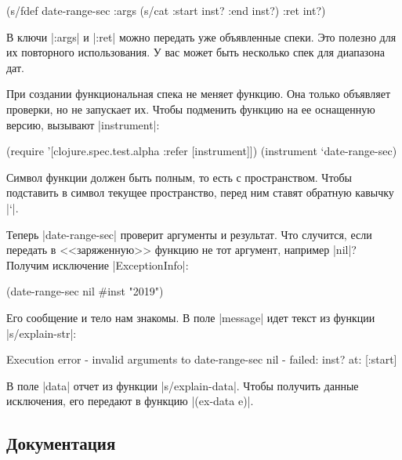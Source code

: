 \begin{english}
  \begin{clojure}
(s/fdef date-range-sec
  :args (s/cat :start inst? :end inst?)
  :ret int?)
  \end{clojure}
\end{english}

В ключи \spverb|:args| и \spverb|:ret| можно передать уже объявленные спеки. Это
полезно для их повторного использования. У вас может быть несколько спек для
диапазона дат.

При создании функциональная спека не меняет функцию. Она только объявляет
проверки, но не запускает их. Чтобы подменить функцию на ее оснащенную версию,
вызывают \spverb|instrument|:

\begin{english}
  \begin{clojure}
(require '[clojure.spec.test.alpha :refer [instrument]])
(instrument `date-range-sec)
  \end{clojure}
\end{english}

Символ функции должен быть полным, то есть с пространством. Чтобы подставить в
символ текущее пространство, перед ним ставят обратную кавычку \spverb|`|.

Теперь \spverb|date-range-sec| проверит аргументы и результат. Что случится,
если передать в <<заряженную>> функцию не тот аргумент, например \spverb|nil|?
Получим исключение \spverb|ExceptionInfo|:

\begin{english}
  \begin{clojure}
(date-range-sec nil #inst "2019")
  \end{clojure}
\end{english}

Его сообщение и тело нам знакомы. В поле \spverb|message| идет текст из функции
\spverb|s/explain-str|:

\begin{english}
  \begin{clojure}
Execution error - invalid arguments to date-range-sec
nil - failed: inst? at: [:start]
  \end{clojure}
\end{english}

В поле \spverb|data| отчет из функции \spverb|s/explain-data|. Чтобы получить
данные исключения, его передают в функцию \spverb|(ex-data e)|.

\subsection{Документация}

